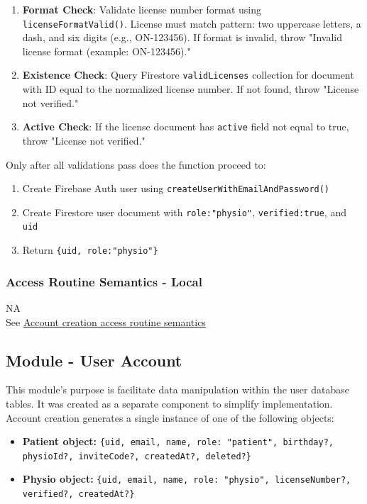 \documentclass[12pt, titlepage]{article}
\begin{document}
\begin{enumerate}
\item \textbf{Format Check}: Validate license number format using \texttt{licenseFormatValid()}. License must match pattern: two uppercase letters, a dash, and six digits (e.g., ON-123456). If format is invalid, throw "Invalid license format (example: ON-123456)."

\item \textbf{Existence Check}: Query Firestore \texttt{validLicenses} collection for document with ID equal to the normalized license number. If not found, throw "License not verified."

\item \textbf{Active Check}: If the license document has \texttt{active} field not equal to true, throw "License not verified."

\end{enumerate}

Only after all validations pass does the function proceed to:
\begin{enumerate}
\item Create Firebase Auth user using \texttt{createUserWithEmailAndPassword()}
\item Create Firestore user document with \texttt{role:"physio"}, \texttt{verified:true}, and \texttt{uid}
\item Return \texttt{\{uid, role:"physio"\}}
\end{enumerate}

\subsubsection{Access Routine Semantics - Local}
NA\\
See \href{sec:acARS}{Account creation access routine semantics}



\subsection{Module - User Account} \label{section:user account}

This module's purpose is facilitate data manipulation within the user database tables. It was created as a separate component
to simplify implementation.
Account creation generates a single instance of one of the following objects:\\
\begin{itemize}
    \item \textbf{Patient object:} 
        \texttt{\{uid, email, name, role: "patient", birthday?, physioId?, inviteCode?, createdAt?, deleted?\}}
    
    \item \textbf{Physio object:}
        \texttt{\{uid, email, name, role: "physio", licenseNumber?, verified?, createdAt?\}}
\end{itemize}
\end{document}
